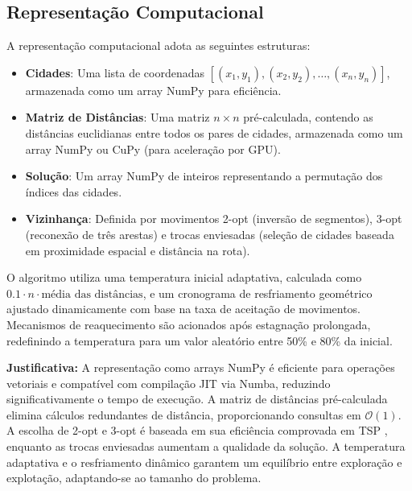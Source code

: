 \documentclass[11pt]{article}
\begin{document}
\subsection{Representação Computacional}
A representação computacional adota as seguintes estruturas:
\begin{itemize}
    \item \textbf{Cidades}: Uma lista de coordenadas \([(x_1, y_1), (x_2, y_2), \ldots, (x_n, y_n)]\), armazenada como um array NumPy para eficiência.
    \item \textbf{Matriz de Distâncias}: Uma matriz \(n \times n\) pré-calculada, contendo as distâncias euclidianas entre todos os pares de cidades, armazenada como um array NumPy ou CuPy (para aceleração por GPU).
    \item \textbf{Solução}: Um array NumPy de inteiros representando a permutação dos índices das cidades.
    \item \textbf{Vizinhança}: Definida por movimentos 2-opt (inversão de segmentos), 3-opt (reconexão de três arestas) e trocas enviesadas (seleção de cidades baseada em proximidade espacial e distância na rota).
\end{itemize}

O algoritmo utiliza uma temperatura inicial adaptativa, calculada como $0.1 \cdot n \cdot \text{média das distâncias}$, e um cronograma de resfriamento geométrico ajustado dinamicamente com base na taxa de aceitação de movimentos. Mecanismos de reaquecimento são acionados após estagnação prolongada, redefinindo a temperatura para um valor aleatório entre 50\% e 80\% da inicial.

\textbf{Justificativa:} A representação como arrays NumPy é eficiente para operações vetoriais e compatível com compilação JIT via Numba, reduzindo significativamente o tempo de execução. A matriz de distâncias pré-calculada elimina cálculos redundantes de distância, proporcionando consultas em $\mathcal{O}\left(1\right)$. A escolha de 2-opt e 3-opt é baseada em sua eficiência comprovada em TSP \cite{lin1973effective}, enquanto as trocas enviesadas aumentam a qualidade da solução. A temperatura adaptativa e o resfriamento dinâmico garantem um equilíbrio entre exploração e explotação, adaptando-se ao tamanho do problema.
\end{document}
